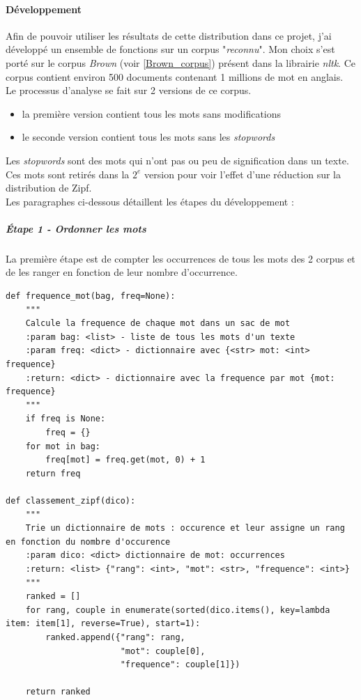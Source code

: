 \documentclass[a4paper,12pt]{article}
\begin{document}
	\paragraph{Développement}
		Afin de pouvoir utiliser les résultats de cette distribution dans ce projet, j'ai développé un ensemble de fonctions sur un corpus "\emph{reconnu}". Mon choix s'est porté sur le corpus \emph{Brown} (voir \ref{Brown_corpus}) présent dans la librairie \emph{nltk}. Ce corpus contient environ 500 documents contenant 1 millions de mot en anglais.\\
		
		Le processus d'analyse se fait sur 2 versions de ce corpus.
		\begin{itemize}
			\item la première version contient tous les mots sans modifications
			\item le seconde version contient tous les mots sans les \emph{stopwords}
		\end{itemize}
		Les \emph{stopwords} sont des mots qui n'ont pas ou peu de signification dans un texte. Ces mots sont retirés dans la $2^e$ version pour voir l'effet d'une réduction sur la distribution de Zipf. \\
		
		Les paragraphes ci-dessous détaillent les étapes du développement :
		
		\subparagraph{Étape 1 - Ordonner les mots}
			La première étape est de compter les occurrences de tous les mots des 2 corpus et de les ranger en fonction de leur nombre d’occurrence. 
			\begin{lstlisting}[title=Triage des mots]
def frequence_mot(bag, freq=None):
    """
    Calcule la frequence de chaque mot dans un sac de mot
    :param bag: <list> - liste de tous les mots d'un texte
    :param freq: <dict> - dictionnaire avec {<str> mot: <int> frequence}
    :return: <dict> - dictionnaire avec la frequence par mot {mot: frequence}
    """
    if freq is None:
        freq = {}
    for mot in bag:
        freq[mot] = freq.get(mot, 0) + 1
    return freq
		
def classement_zipf(dico):
    """
    Trie un dictionnaire de mots : occurence et leur assigne un rang en fonction du nombre d'occurence
    :param dico: <dict> dictionnaire de mot: occurrences
    :return: <list> {"rang": <int>, "mot": <str>, "frequence": <int>}
    """
    ranked = []
    for rang, couple in enumerate(sorted(dico.items(), key=lambda item: item[1], reverse=True), start=1):
        ranked.append({"rang": rang,
                       "mot": couple[0],
                       "frequence": couple[1]})

    return ranked \end{lstlisting}
    
\end{document}
